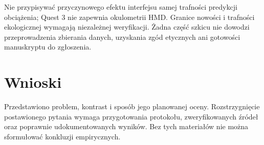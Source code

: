 \documentclass[11pt,a4paper]{article}
\begin{document}
Nie przypisywać przyczynowego efektu interfejsu samej trafności predykcji obciążenia; Quest 3 nie zapewnia okulometrii HMD. Granice nowości i trafności ekologicznej wymagają niezależnej weryfikacji. Żadna część szkicu nie dowodzi przeprowadzenia zbierania danych, uzyskania zgód etycznych ani gotowości manuskryptu do zgłoszenia.

\section{Wnioski}

Przedstawiono problem, kontrast i sposób jego planowanej oceny. Rozstrzygnięcie postawionego pytania wymaga przygotowania protokołu, zweryfikowanych źródeł oraz poprawnie udokumentowanych wyników. Bez tych materiałów nie można sformułować konkluzji empirycznych.
\end{document}
